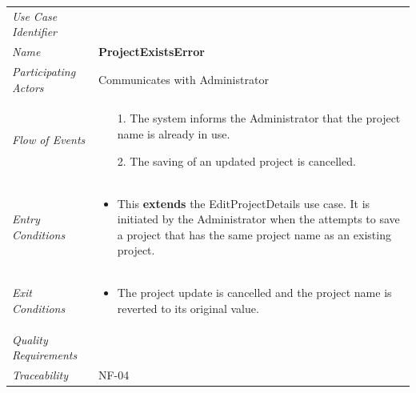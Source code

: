\documentclass[12pt,letterpaper]{article}
\begin{document}
\begin{center}
	\begin{tabu} to 
		\toprule
		Use Case Identifier & \projectexistserror{} \\
		Name & {\bf ProjectExistsError} \\
		Participating Actors & Communicates with Administrator \\
		Flow of Events & 
		\begin{minipage}[t]{\linewidth}
		    \begin{enumerate}
			    \item[1.] The system informs the Administrator that the project name is already in use.
			    \item[2.] The saving of an updated project is cancelled.
			\end{enumerate}
		\end{minipage} \\

		Entry Conditions &
		\begin{minipage}[t]{\linewidth}
			\begin{itemize}
			    \item This \textbf{extends} the EditProjectDetails use case. It is initiated by the Administrator when the attempts to save a project that has the same project name as an existing project.
	        \end{itemize}
		\end{minipage} \\

		Exit Conditions &
		\begin{minipage}[t]{\linewidth}
			\begin{itemize}
			    \item The project update is cancelled and the project name is reverted to its original value.
	        \end{itemize}
		\end{minipage} \\

		Quality Requirements & \\

		Traceability & NF-04 \\
		\toprule
	\end{tabu}
\end{center}
\end{document}
